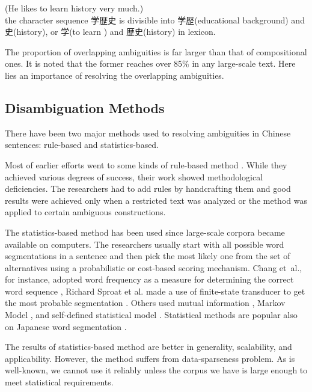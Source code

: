 \hspace*{3zw}{\small 他非常喜歓学歴史。}  (He likes to learn history very much.)\\
the character sequence {\small 学歴史} is divisible  into {\small 学歴}(educational background)
and {\small 史}(history), or {\small 学}(to learn ) and {\small 歴史}(history) in lexicon.

The proportion of overlapping ambiguities is far larger than that
of compositional ones. It is noted that the former reaches over 85\% \cite{Liu98}
in any large-scale text. Here lies an importance of resolving
the overlapping ambiguities.

\subsection{Disambiguation Methods}
\label{disambig}

There have been two major methods used to resolving ambiguities in
Chinese sentences: rule-based and statistics-based.

Most of earlier efforts went to some kinds of rule-based method
\cite{Liang87,Yao90,Wang91,Yeh91,Chen92,Luo96}. While they achieved various degrees of success,
their work showed methodological deficiencies.
The researchers had to add rules by handcrafting them and good results
were achieved only when a restricted text was analyzed or the method
was applied to certain ambiguous constructions.

The statistics-based method has been used since large-scale corpora became
available on computers. The researchers usually start with all possible word
segmentations in a sentence and then pick the most likely one from the set of
alternatives using a probabilistic or cost-based scoring mechanism.
Chang et~al., for instance, adopted word frequency as a measure
for determining the correct word sequence \cite{Chang91},
Richard Sproat et al. made a use of finite-state transducer to get the most
probable segmentation \cite{Sproat96}.
Others used mutual information \cite{Lua94},
Markov Model \cite{Lai92},
and self-defined statistical model \cite{Fu99}.
Statistical methods are popular also
on Japanese word segmentation \cite{Nagata94,Oda99}.

The results of statistics-based method are better in generality, scalability,
and applicability. However, the method suffers from data-sparseness problem.
As is well-known, we cannot use it reliably unless the corpus we have is large
enough to meet statistical requirements.

